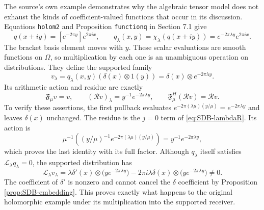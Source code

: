 The source's own example demonstrates why the algebraic tensor
model does not exhaust the kinds of coefficient-valued functions
that occur in its discussion. Equations \texttt{holom2} and
Proposition \texttt{functionq} in Section 7.1 give
\begin{equation}\tag{SDB58}\label{eq:SDB-movingq}
 q(x+iy)=[e^{-2\pi y}]e^{2\pi ix},\qquad
 q_\lambda(x,y)=\chi_\lambda(q(x+iy))
        =e^{-2\pi\lambda y}e^{2\pi ix}.
\end{equation}
The bracket basis element moves with $y$. These scalar evaluations
are smooth functions on $\Omega$, so multiplication by each one is
an unambiguous operation on distributions. They define the supported
family
\begin{equation}\tag{SDB59}\label{eq:SDB-supportedq}
 v_\lambda=q_\lambda(x,y)(\delta(x)\otimes1(y))
      =\delta(x)\otimes e^{-2\pi\lambda y}.
\end{equation}
Its arithmetic action and residue are exactly
\begin{equation}\tag{SDB60}\label{eq:SDB-qreceiver}
 \mathfrak F_\mu v=v,\qquad
 (\mathcal Rv)_\lambda=y^{-1}e^{-2\pi\lambda y},\qquad
 \mathfrak F_\mu^H(\mathcal Rv)=\mathcal Rv.
\end{equation}
To verify these assertions, the first pullback evaluates
$e^{-2\pi(\lambda\mu)(y/\mu)}=e^{-2\pi\lambda y}$
and leaves $\delta(x)$ unchanged. The residue is the $j=0$ term
of \eqref{eq:SDB-lambdaR}. Its action is
\[
 \mu^{-1}\left((y/\mu)^{-1}
           e^{-2\pi(\lambda\mu)(y/\mu)}\right)
       =y^{-1}e^{-2\pi\lambda y},
\]
which proves the last identity with its full factor.
Although $q_\lambda$ itself satisfies
$\mathcal L_\lambda q_\lambda=0$, the supported distribution
has
\begin{equation}\tag{SDB61}\label{eq:SDB-qnoncycle}
 \mathcal L_\lambda v_\lambda
    =\lambda\delta'(x)\otimes
                   \bigl(y e^{-2\pi\lambda y}\bigr)
       -2\pi i\lambda\delta(x)\otimes
                   \bigl(y e^{-2\pi\lambda y}\bigr)\ne0.
\end{equation}
The coefficient of $\delta'$ is nonzero and cannot cancel the
$\delta$ coefficient by Proposition \ref{prop:SDB-embedding}.
This proves exactly what happens to the original holomorphic
example under its multiplication into the supported receiver.

